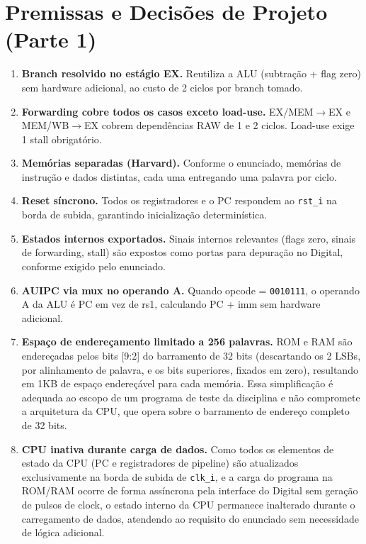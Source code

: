 \documentclass[12pt, a4paper]{article}
\newcommand{\code}[1]{\texttt{#1}}
\begin{document}
\section{Premissas e Decisões de Projeto (Parte 1)}

\begin{enumerate}[leftmargin=2em]
  \item \textbf{Branch resolvido no estágio EX.} Reutiliza a ALU (subtração
    + flag zero) sem hardware adicional, ao custo de 2 ciclos por branch tomado.

  \item \textbf{Forwarding cobre todos os casos exceto load-use.} EX/MEM$\to$EX
    e MEM/WB$\to$EX cobrem dependências RAW de 1 e 2 ciclos. Load-use exige
    1 stall obrigatório.

  \item \textbf{Memórias separadas (Harvard).} Conforme o enunciado, memórias
    de instrução e dados distintas, cada uma entregando uma palavra por ciclo.

  \item \textbf{Reset síncrono.} Todos os registradores e o PC respondem ao
    \code{rst\_i} na borda de subida, garantindo inicialização determinística.

  \item \textbf{Estados internos exportados.} Sinais internos relevantes (flags
    zero, sinais de forwarding, stall) são expostos como portas para depuração
    no Digital, conforme exigido pelo enunciado.

  \item \textbf{AUIPC via mux no operando A.} Quando opcode = \code{0010111},
    o operando A da ALU é PC em vez de rs1, calculando PC + imm sem
    hardware adicional.

  \item \textbf{Espaço de endereçamento limitado a 256 palavras.} ROM e RAM
    são endereçadas pelos bits [9:2] do barramento de 32 bits (descartando
    os 2 LSBs, por alinhamento de palavra, e os bits superiores, fixados em
    zero), resultando em 1KB de espaço endereçável para cada memória. Essa
    simplificação é adequada ao escopo de um programa de teste da
    disciplina e não compromete a arquitetura da CPU, que opera sobre o
    barramento de endereço completo de 32 bits.

  \item \textbf{CPU inativa durante carga de dados.} Como todos os elementos
    de estado da CPU (PC e registradores de pipeline) são atualizados
    exclusivamente na borda de subida de \code{clk\_i}, e a carga do programa
    na ROM/RAM ocorre de forma assíncrona pela interface do Digital sem
    geração de pulsos de clock, o estado interno da CPU permanece
    inalterado durante o carregamento de dados, atendendo ao requisito do
    enunciado sem necessidade de lógica adicional.
\end{enumerate}
\end{document}
